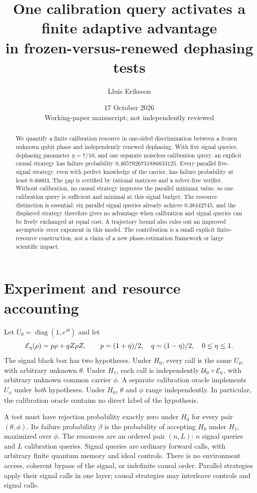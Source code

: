 \documentclass[11pt,a4paper]{article}
\title{One calibration query activates a finite adaptive advantage\\in frozen-versus-renewed dephasing tests}
\author{Lluis Eriksson}
\date{17 October 2026\\[3pt]\small Working-paper manuscript; not independently reviewed}
\newcommand{\diag}{\operatorname{diag}}
\begin{document}
\maketitle
\begin{abstract}
We quantify a finite calibration resource in one-sided discrimination between a frozen unknown qubit phase and independently renewed dephasing. With five signal queries, dephasing parameter $\eta=7/10$, and one separate noiseless calibration query, an explicit causal strategy has failure probability $0.4657926731886833125$. Every parallel five-signal strategy, even with perfect knowledge of the carrier, has failure probability at least $0.46603$. The gap is certified by rational matrices and a solver-free verifier. Without calibration, no causal strategy improves the parallel minimax value, so one calibration query is sufficient and minimal at this signal budget. The resource distinction is essential: six parallel signal queries already achieve $0.38442745$, and the displayed strategy therefore gives no advantage when calibration and signal queries can be freely exchanged at equal cost. A trajectory bound also rules out an improved asymptotic error exponent in this model. The contribution is a small explicit finite-resource construction, not a claim of a new phase-estimation framework or large scientific impact.
\end{abstract}
\section{Experiment and resource accounting}
Let $U_\theta=\diag(1,e^{i\theta})$ and let
\[
 {\cal E}_{\eta}(\rho)=p\rho+qZ\rho Z,\qquad
 p=(1+\eta)/2,\quad q=(1-\eta)/2,\quad 0\leq\eta\leq1.
\]
The signal black box has two hypotheses. Under $H_0$, every call is the same $U_\theta$, with arbitrary unknown $\theta$. Under $H_1$, each call is independently $\mathcal U_{\phi}\circ{\cal E}_{\eta}$, with arbitrary unknown common carrier $\phi$. A separate calibration oracle implements $U_\phi$ under \emph{both} hypotheses. Under $H_0$, $\theta$ and $\phi$ range independently. In particular, the calibration oracle contains no direct label of the hypothesis.

A test must have rejection probability exactly zero under $H_0$ for every pair $(\theta,\phi)$. Its failure probability $\beta$ is the probability of accepting $H_0$ under $H_1$, maximized over $\phi$. The resources are an ordered pair $(n,L)$: $n$ signal queries and $L$ calibration queries. Signal queries are ordinary forward calls, with arbitrary finite quantum memory and ideal controls. There is no environment access, coherent bypass of the signal, or indefinite causal order. Parallel strategies apply their signal calls in one layer; causal strategies may interleave controls and signal calls.
\end{document}
